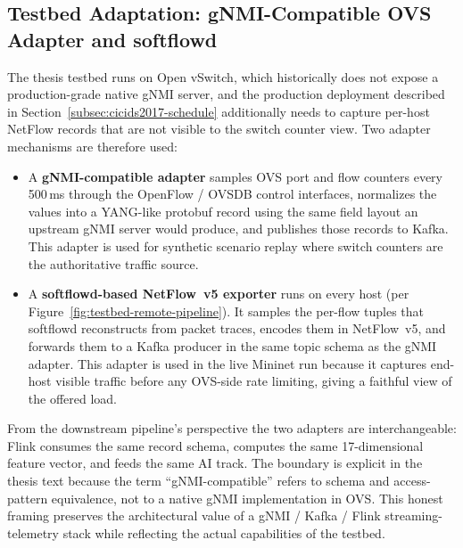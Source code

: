 \documentclass[12pt, a4paper, reqno, oneside]{book}
\begin{document}
\subsection{Testbed Adaptation: gNMI-Compatible OVS Adapter and softflowd}
\label{subsec:telemetry-adaptation-bg}

The thesis testbed runs on Open vSwitch, which historically does not expose
a production-grade native gNMI server, and the production deployment
described in Section~\ref{subsec:cicids2017-schedule} additionally needs to
capture per-host NetFlow records that are not visible to the switch counter
view. Two adapter mechanisms are therefore used:

\begin{itemize}
    \item A \textbf{gNMI-compatible adapter} samples OVS port and flow
          counters every 500\,ms through the OpenFlow / OVSDB control
          interfaces, normalizes the values into a YANG-like protobuf
          record using the same field layout an upstream gNMI server would
          produce, and publishes those records to Kafka. This adapter is
          used for synthetic scenario replay where switch counters are the
          authoritative traffic source.
    \item A \textbf{softflowd-based NetFlow~v5 exporter} runs on every host
          (per Figure~\ref{fig:testbed-remote-pipeline}). It samples the
          per-flow tuples that softflowd reconstructs from packet traces,
          encodes them in NetFlow~v5, and forwards them to a Kafka
          producer in the same topic schema as the gNMI adapter. This
          adapter is used in the live Mininet run because it captures
          end-host visible traffic before any OVS-side rate limiting,
          giving a faithful view of the offered load.
\end{itemize}

From the downstream pipeline's perspective the two adapters are
interchangeable: Flink consumes the same record schema, computes the same
17-dimensional feature vector, and feeds the same AI track. The boundary is
explicit in the thesis text because the term ``gNMI-compatible'' refers to
schema and access-pattern equivalence, not to a native gNMI implementation in
OVS. This honest framing preserves the architectural value of a gNMI / Kafka
/ Flink streaming-telemetry stack while reflecting the actual capabilities
of the testbed.

\end{document}
